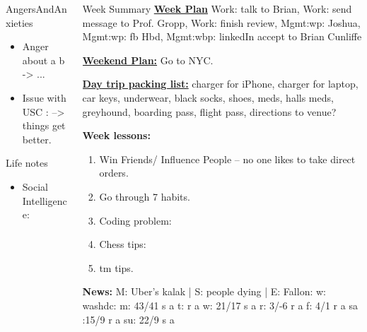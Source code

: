 \documentclass[serif, mathserif, final]{beamer}
\begin{document}
\begin{frame}
\begin{columns}
\begin{column}{0.25\linewidth}
\begin{block}{AngersAndAnxieties}
\begin{itemize}
        \item \tiny Anger about a b  -> ...
        \item \tiny Issue with USC : --> things get better. 
        \end{itemize}
      \end{block}
      \begin{block}{Life notes}
        \begin{itemize}
          \tiny \item \tiny Social Intelligence: 
        \end{itemize}
      \end{block}
    \end{column}


\begin{column}{0.5\linewidth}
  \begin{block}{Week Summary}
    {\tiny \underline{\bf Week Plan} Work: talk to Brian, Work: send
      message to Prof. Gropp, Work: finish review, Mgmt:wp: Joshua,
      Mgmt:wp: fb Hbd,  Mgmt:wbp: linkedIn accept to Brian Cunliffe}


    {\tiny \underline{\bf Weekend Plan:} Go to NYC. } 

    {\underline{\bf Day trip packing list:} charger for iPhone,
      charger for laptop, car keys, underwear, black socks, shoes,
      meds, halls meds, greyhound, boarding pass, flight pass, directions to
      venue?}

    {\tiny {\bf Week lessons:}}
    \begin{enumerate}
      \tiny \item \tiny Win Friends/ Influence People – no one
      likes to take direct orders.
    \item \tiny Go through 7 habits.
    \item \tiny Coding problem: 
    \item \tiny Chess tips: 
    \item \tiny tm tips.
    \end{enumerate}
        {{\tiny {\bf News:}} M: Uber's kalak  | S:  people dying  
          | E: Fallon: 
          w: washdc: {m: {43/41 s a}}  t:{ r a} {w: {21/17 s a}} {r:
            {3/-6 r a}} {f: {4/1 r a}} {sa :{15/9 r a} }
          {su: {22/9 s a  }}}
  \end{block} 


\end{column}
\end{columns}
\end{frame}
\end{document}

